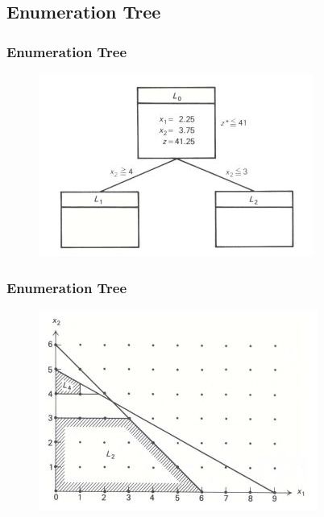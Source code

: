\documentclass{beamer}
\begin{document}
\subsection{Enumeration Tree}
\begin{frame}
	\frametitle{Enumeration Tree}
	\begin{figure}
		\centering
		\includegraphics[width=0.7\linewidth]{enumerationtree1}
		\caption{}
		\label{fig:enumerationtree1}
	\end{figure}
	
\end{frame}
\begin{frame}
	\frametitle{Enumeration Tree}
	\begin{figure}
		\centering
		\includegraphics[width=0.7\linewidth]{enumerationtree2}
		\caption{}
		\label{fig:enumerationtree2}
	\end{figure}
	
\end{frame}
\end{document}
